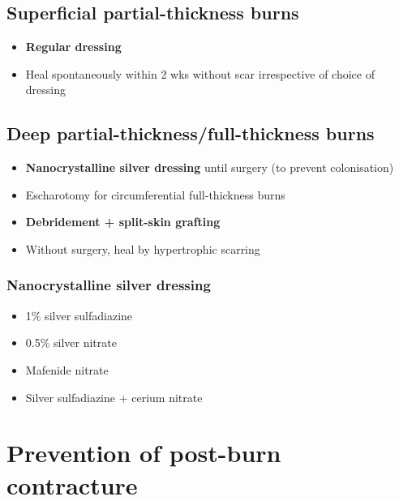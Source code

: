 \documentclass[
  12pt,
]{memoir}
\providecommand{\tightlist}{%
  \setlength{\itemsep}{0pt}\setlength{\parskip}{0pt}}
\begin{document}
\hypertarget{superficial-partial-thickness-burns-1}{%
\subsection{Superficial partial-thickness
burns}\label{superficial-partial-thickness-burns-1}}

\begin{itemize}
\tightlist
\item
  \textbf{Regular dressing}
\item
  Heal spontaneously within 2 wks without scar irrespective of choice of
  dressing
\end{itemize}

\hypertarget{deep-partial-thicknessfull-thickness-burns}{%
\subsection{Deep partial-thickness/full-thickness
burns}\label{deep-partial-thicknessfull-thickness-burns}}

\begin{itemize}
\tightlist
\item
  \textbf{Nanocrystalline silver dressing} until surgery (to prevent
  colonisation)
\item
  Escharotomy for circumferential full-thickness burns
\item
  \textbf{Debridement + split-skin grafting}
\item
  Without surgery, heal by hypertrophic scarring
\end{itemize}

\hypertarget{nanocrystalline-silver-dressing}{%
\subsubsection{Nanocrystalline silver
dressing}\label{nanocrystalline-silver-dressing}}

\begin{itemize}
\tightlist
\item
  1\% silver sulfadiazine
\item
  0.5\% silver nitrate
\item
  Mafenide nitrate
\item
  Silver sulfadiazine + cerium nitrate
\end{itemize}

\hypertarget{prevention-of-post-burn-contracture}{%
\section{Prevention of post-burn
contracture}\label{prevention-of-post-burn-contracture}}
\end{document}
